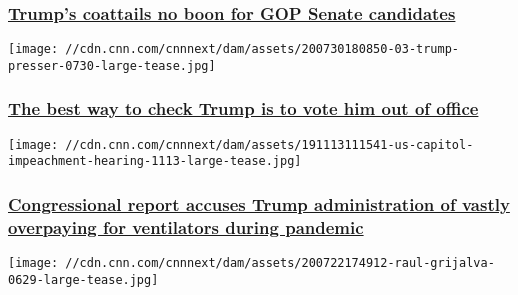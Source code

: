 \hypertarget{trumps-coattails-no-boon-for-gop-senate-candidates-}{%
\subsubsection{\texorpdfstring{\href{/2020/08/02/politics/donald-trump-senate-election/index.html}{Trump's
coattails no boon for GOP Senate candidates
}}{Trump's coattails no boon for GOP Senate candidates }}\label{trumps-coattails-no-boon-for-gop-senate-candidates-}}

\href{/2020/08/01/opinions/trump-delay-election-abuse-of-power-zelizer/index.html}{}

\texttt{[image: //cdn.cnn.com/cnnnext/dam/assets/200730180850-03-trump-presser-0730-large-tease.jpg]}

\hypertarget{the-best-way-to-check-trump-is-to-vote-him-out-of-office}{%
\subsubsection{\texorpdfstring{\href{/2020/08/01/opinions/trump-delay-election-abuse-of-power-zelizer/index.html}{The
best way to check Trump is to vote him out of
office}}{The best way to check Trump is to vote him out of office}}\label{the-best-way-to-check-trump-is-to-vote-him-out-of-office}}

\href{/2020/07/31/politics/congress-ventilator-report-released/index.html}{}

\texttt{[image: //cdn.cnn.com/cnnnext/dam/assets/191113111541-us-capitol-impeachment-hearing-1113-large-tease.jpg]}

\hypertarget{congressional-report-accuses-trump-administration-of-vastly-overpaying-for-ventilators-during-pandemic}{%
\subsubsection{\texorpdfstring{\href{/2020/07/31/politics/congress-ventilator-report-released/index.html}{Congressional
report accuses Trump administration of vastly overpaying for ventilators
during
pandemic}}{Congressional report accuses Trump administration of vastly overpaying for ventilators during pandemic}}\label{congressional-report-accuses-trump-administration-of-vastly-overpaying-for-ventilators-during-pandemic}}

\href{/2020/08/01/politics/raul-grijalva-tests-positive-covid-19/index.html}{}

\texttt{[image: //cdn.cnn.com/cnnnext/dam/assets/200722174912-raul-grijalva-0629-large-tease.jpg]}

